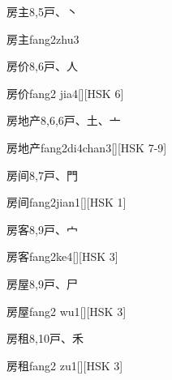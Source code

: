 \begin{Entry}{房主}{8,5}{⼾、⼂}
  \begin{Phonetics}{房主}{fang2zhu3}
  \end{Phonetics}
\end{Entry}

\begin{Entry}{房价}{8,6}{⼾、⼈}
  \begin{Phonetics}{房价}{fang2 jia4}[][HSK 6]
  \end{Phonetics}
\end{Entry}

\begin{Entry}{房地产}{8,6,6}{⼾、⼟、⼇}
  \begin{Phonetics}{房地产}{fang2di4chan3}[][HSK 7-9]
  \end{Phonetics}
\end{Entry}

\begin{Entry}{房间}{8,7}{⼾、⾨}
  \begin{Phonetics}{房间}{fang2jian1}[][HSK 1]
  \end{Phonetics}
\end{Entry}

\begin{Entry}{房客}{8,9}{⼾、⼧}
  \begin{Phonetics}{房客}{fang2ke4}[][HSK 3]
  \end{Phonetics}
\end{Entry}

\begin{Entry}{房屋}{8,9}{⼾、⼫}
  \begin{Phonetics}{房屋}{fang2 wu1}[][HSK 3]
  \end{Phonetics}
\end{Entry}

\begin{Entry}{房租}{8,10}{⼾、⽲}
  \begin{Phonetics}{房租}{fang2 zu1}[][HSK 3]
  \end{Phonetics}
\end{Entry}

